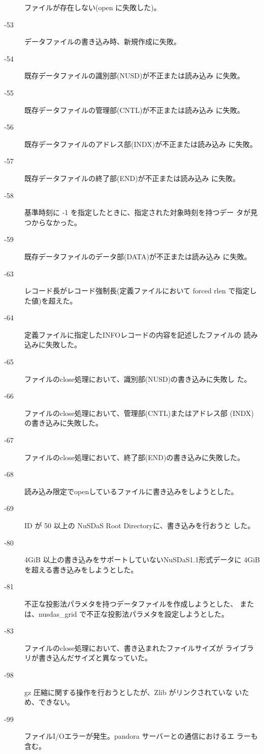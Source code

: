 \begin{description}
	    ファイルが存在しない(open に失敗した)。
 \item[-53]
	    データファイルの書き込み時、新規作成に失敗。
 \item[-54] 
	    既存データファイルの識別部(NUSD)が不正または読み込み
	    に失敗。
 \item[-55] 
	    既存データファイルの管理部(CNTL)が不正または読み込み
	    に失敗。
 \item[-56] 
	    既存データファイルのアドレス部(INDX)が不正または読み込み
	    に失敗。
 \item[-57] 
	    既存データファイルの終了部(END)が不正または読み込み
	    に失敗。
 \item[-58]
	    基準時刻に -1 を指定したときに、指定された対象時刻を持つデー
	    タが見つからなかった。
 \item[-59] 
	    既存データファイルのデータ部(DATA)が不正または読み込み
	    に失敗。
 \item[-63] 
	    レコード長がレコード強制長(定義ファイルにおいて forced rlen
	    で指定した値)を超えた。
 \item[-64]
	    定義ファイルに指定したINFOレコードの内容を記述したファイルの
	    読み込みに失敗した。
 \item[-65]
	    ファイルのclose処理において、識別部(NUSD)の書き込みに失敗し
	    た。
 \item[-66]
	    ファイルのclose処理において、管理部(CNTL)またはアドレス部
	    (INDX)の書き込みに失敗した。
 \item[-67]
	    ファイルのclose処理において、終了部(END)の書き込みに失敗した。
 \item[-68]
	    読み込み限定でopenしているファイルに書き込みをしようとした。
 \item[-69]
	    ID が 50 以上の NuSDaS Root Directoryに、書き込みを行おうと
	    した。
 \item[-80]
	    4GiB 以上の書き込みをサポートしていないNuSDaS1.1形式データに
	    4GiB を超える書き込みをしようとした。
 \item[-81]
 	    不正な投影法パラメタを持つデータファイルを作成しようとした、
	    または、nusdas\_grid で不正な投影法パラメタを設定しようとした。
 \item[-83]
	    ファイルのclose処理において、書き込まれたファイルサイズが
	    ライブラリが書き込んだサイズと異なっていた。
 \item[-98]
	    gz 圧縮に関する操作を行おうとしたが、Zlib がリンクされていな
	    いため、できない。
 \item[-99]
	    ファイルI/Oエラーが発生。pandora サーバーとの通信におけるエ
	    ラーも含む。
\end{description}

